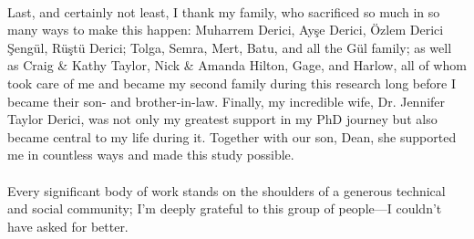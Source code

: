 \paragraph{}%
  Last, and certainly not least, I thank my family, who sacrificed so much in so many ways to make this happen: Muharrem Derici, Ayşe Derici, Özlem Derici Şengül, Rüştü Derici; Tolga, Semra, Mert, Batu, and all the Gül family; as well as Craig \& Kathy Taylor, Nick \& Amanda Hilton, Gage, and Harlow, all of whom took care of me and became my second family during this research long before I became their son- and brother-in-law. Finally, my incredible wife, Dr. Jennifer Taylor Derici, was not only my greatest support in my PhD journey but also became central to my life during it. Together with our son, Dean, she supported me in countless ways and made this study possible.

\paragraph{}%
  Every significant body of work stands on the shoulders of a generous technical and social community; I'm deeply grateful to this group of people—I couldn't have asked for better.


